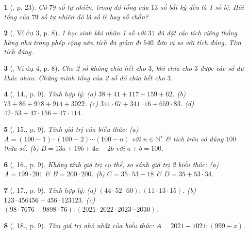 \documentclass{article}
\newtheorem{baitoan}{}
\begin{document}
\begin{baitoan}[\cite{Binh_boi_duong_Toan_6_tap_1}, p. 23]
	Có $79$ số tự nhiên, trong đó tổng của $13$ số bất kỳ đều là 1 số lẻ. Hỏi tổng của $79$ số tự nhiên đó là số lẻ hay số chẵn?
\end{baitoan}

\begin{baitoan}[\cite{Tuyen_Toan_6}, Ví dụ 3, p. 8]
	1 học sinh khi nhân 1 số với $31$ đã đặt các tích riêng thẳng hàng như trong phép cộng nên tích đã giảm đi $540$ đơn vị so với tích đúng. Tìm tích đúng.
\end{baitoan}

\begin{baitoan}[\cite{Tuyen_Toan_6}, Ví dụ 4, p. 8]
	Cho 2 số không chia hết cho $3$, khi chia cho $3$ được các số dư khác nhau. Chứng minh tổng của 2 số đó chia hết cho $3$.
\end{baitoan}

\begin{baitoan}[\cite{Tuyen_Toan_6}, 14., p. 9]
	Tính hợp lý: (a) $38 + 41 + 117 + 159 + 62$. (b) $73 + 86 + 978 + 914 + 3022$. (c) $341\cdot67 + 341\cdot16 + 659\cdot83$. (d) $42\cdot53 + 47\cdot156 - 47\cdot114$.
\end{baitoan}

\begin{baitoan}[\cite{Tuyen_Toan_6}, 15., p. 9]
	Tính giá trị của biểu thức: (a) $A = (100 - 1)\cdot(100 - 2)\cdots(100 - n)$ với $n\in\mathbb{N}^\star$ \& tích trên có đúng $100$ thừa số. (b) $B = 13a + 19b + 4a - 2b$ với $a + b = 100$.
\end{baitoan}

\begin{baitoan}[\cite{Tuyen_Toan_6}, 16., p. 9]
	Không tính giá trị cụ thể, so sánh giá trị 2 biểu thức: (a) $A = 199\cdot201$ \& $B = 200\cdot200$. (b) $C = 35\cdot53 - 18$ \& $D = 35 + 53\cdot34$.
\end{baitoan}

\begin{baitoan}[\cite{Tuyen_Toan_6}, 17., p. 9]
	Tính hợp lý: (a) $(44\cdot52\cdot60):(11\cdot13\cdot15)$. (b) $123\cdot456456 - 456\cdot123123$. (c) $(98\cdot7676 - 9898\cdot76):(2021\cdot2022\cdot2023\cdots2030)$.
\end{baitoan}

\begin{baitoan}[\cite{Tuyen_Toan_6}, 18., p. 9]
	Tìm giá trị nhỏ nhất của biểu thức: $A = 2021 - 1021:(999 - x)$.
\end{baitoan}
\end{document}
